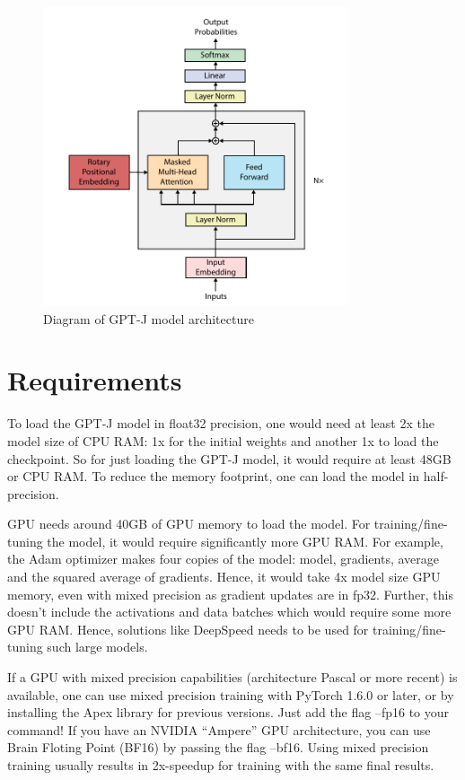 \begin{figure}[htp]
    \centering
    \includegraphics[width=0.8\textwidth]{figures/gpt-j_architecture.pdf}
    \caption{Diagram of GPT-J model architecture}
    \label{fig:gpt-j-architecture}
\end{figure}

\section{Requirements}
\label{sec:requirements}
To load the GPT-J model in float32 precision, one would need at least 2x the model size of CPU RAM: 1x for the initial weights and another 1x to load the checkpoint. So for just loading the GPT-J model, it would require at least 48GB or CPU RAM. To reduce the memory footprint, one can load the model in half-precision.

GPU needs around 40GB of GPU memory to load the model. For training/fine-tuning the model, it would require significantly more GPU RAM. For example, the Adam optimizer makes four copies of the model: model, gradients, average and the squared average of gradients. Hence, it would take 4x model size GPU memory, even with mixed precision as gradient updates are in fp32. Further, this doesn't include the activations and data batches which would require some more GPU RAM. Hence, solutions like DeepSpeed needs to be used for training/fine-tuning such large models.

If a GPU with mixed precision capabilities (architecture Pascal or more recent) is available, one can use mixed precision training with PyTorch 1.6.0 or later, or by installing the Apex library for previous versions. Just add the flag --fp16 to your command! If you have an NVIDIA “Ampere” GPU architecture, you can use Brain Floting Point (BF16) by passing the flag --bf16. Using mixed precision training usually results in 2x-speedup for training with the same final results.

